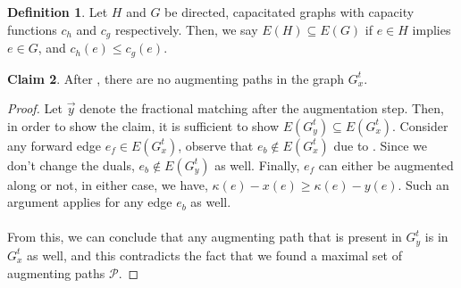 \documentclass[a4paper,11pt]{article}
\theoremstyle{definition}
\newtheorem{definition2}{Definition}
\theoremstyle{definition}
\theoremstyle{definition}
\theoremstyle{definition}
\theoremstyle{definition}
\theoremstyle{definition}
\theoremstyle{definition}
\theoremstyle{definition}
\newtheorem{claim2}[definition2]{Claim}
\theoremstyle{definition}
\theoremstyle{definition}
\theoremstyle{definition}
\theoremstyle{definition}
\theoremstyle{definition}
\theoremstyle{definition}
\theoremstyle{definition}
\begin{document}
\begin{definition2}
    Let $H$ and $G$ be directed, capacitated graphs with capacity functions $c_h$ and $c_g$ respectively. Then, we say $E(H)\subseteq E(G)$ if $e\in H$ implies $e\in G$, and $c_h(e)\leqslant c_g(e)$. 
\end{definition2}

\begin{claim2}\label{claim:noaugpaths}
After , there are no augmenting paths in the graph $G^t_x$. 
\end{claim2}
\begin{proof}
Let $\vec{y}$ denote the fractional matching after the augmentation step. Then, in order to show the claim, it is sufficient to show $E(G^t_y)\subseteq E(G^t_x)$. Consider any forward edge $e_f\in E(G^t_x)$, observe that $e_b\notin E(G^t_x)$ due to . Since we don't change the duals, $e_b\notin E(G^t_y)$ as well. Finally, $e_f$ can either be augmented along or not, in either case, we have, $\kappa(e)-x(e)\geqslant \kappa(e)-y(e)$. Such an argument applies for any edge $e_b$ as well.\\ \\
From this, we can conclude that any augmenting path that is present in $G^t_y$ is in $G^t_x$ as well, and this contradicts the fact that we found a maximal set of augmenting paths $\mathcal{P}$.
\end{proof}
\end{document}
